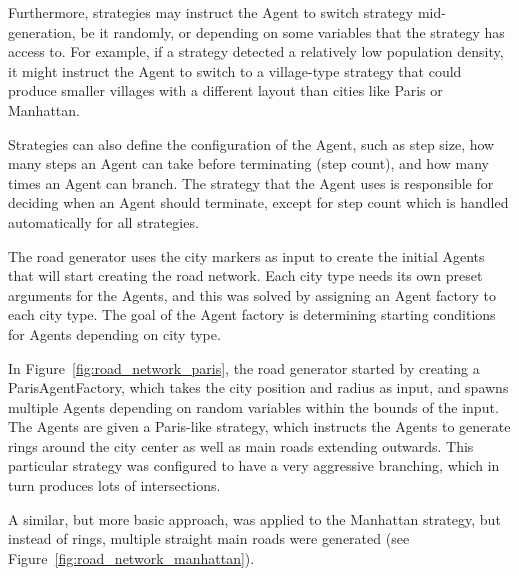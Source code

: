 Furthermore, strategies may instruct the Agent to switch strategy mid-generation, be it randomly, or depending on some variables that the strategy has access to.
For example, if a strategy detected a relatively low population density, it might instruct the Agent to switch to a village-type strategy that could produce smaller villages with a different layout than cities like Paris or Manhattan.

Strategies can also define the configuration of the Agent, such as step size, how many steps an Agent can take before terminating (step count), and how many times an Agent can branch.
The strategy that the Agent uses is responsible for deciding when an Agent should terminate, except for step count which is handled automatically for all strategies.

The road generator uses the city markers as input to create the initial Agents that will start creating the road network.
Each city type needs its own preset arguments for the Agents, and this was solved by assigning an Agent factory to each city type.
The goal of the Agent factory is determining starting conditions for Agents depending on city type.

In Figure~\ref{fig:road_network_paris}, the road generator started by creating a ParisAgentFactory, which takes the city position and radius as input, and spawns multiple Agents depending on random variables within the bounds of the input.
The Agents are given a Paris-like strategy, which instructs the Agents to generate rings around the city center as well as main roads extending outwards.
This particular strategy was configured to have a very aggressive branching, which in turn produces lots of intersections.

A similar, but more basic approach, was applied to the Manhattan strategy, but instead of rings, multiple straight main roads were generated (see Figure~\ref{fig:road_network_manhattan}).

